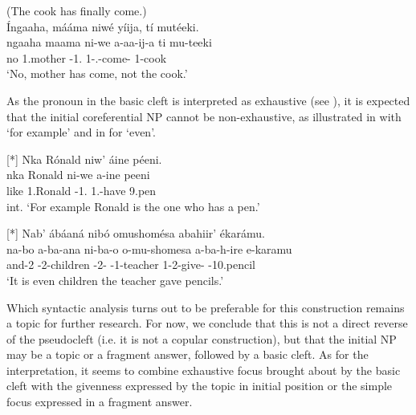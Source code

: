 \documentclass[output=paper]{langscibook}
\begin{document}
\ea
\label{bkm:Ref116288150}
(The cook has finally come.)\\
Íngaaha, mááma niwé yíija, tí mutéeki.\\
\gll
ngaaha  maama  ni-we  a-aa-ij-a  ti  mu-teeki\\
no  1.mother  \COP{}-1.\PRO{}  1\SM{}-\N{}.\PST{}-{}come-\FV{}  \NEG{}  1-cook\\
\glt
‘No, mother has come, not the cook.’\\


\z


As the pronoun in the basic cleft is interpreted as exhaustive (see ), it is expected that the initial coreferential NP cannot be non-exhaustive, as illustrated in  with ‘for example’ and in  for ‘even’.

\sn
[*]{
Nka Rónald niw’ áine péeni.\\
\gll
nka   Ronald  ni-we  a-ine  peeni\\
like   1.Ronald  \COP{}-1.\PRO{}  1\SM{}.\REL{}-have  9.pen\\
\glt
int. ‘For example Ronald is the one who has a pen.’\\
}


\z

\ea
[*]{
\label{bkm:Ref115098927}
Nab’ ábáaná nibó omushomésa abahiir’ ékarámu.\\
\gll
na-bo  a-ba-ana  ni-ba-o  o-mu-shomesa  a-ba-h-ire   e-karamu \\
and-2  \AUG{}-2-children  \COP{}-2-\PRO{}  \AUG{}-1-teacher  1\SM{}-2\OM{}-give-\PFV{} \AUG{}-10.pencil \\
\glt
‘It is even children the teacher gave pencils.’\\
}

\z

Which syntactic analysis turns out to be preferable for this construction remains a topic for further research. For now, we conclude that this is not a direct reverse of the pseudocleft (i.e. it is not a copular construction), but that the initial NP may be a topic or a fragment answer, followed by a basic cleft. As for the interpretation, it seems to combine exhaustive focus brought about by the basic cleft with the givenness expressed by the topic in initial position or the simple focus expressed in a fragment answer.
\end{document}
